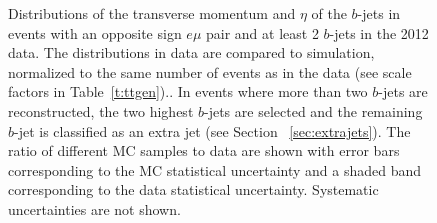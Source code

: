 \begin{figure}
\centering
{}

\caption{Distributions of the transverse momentum and $\eta$ of the $b$-jets in events with an opposite sign $e\mu$ pair  and at least 2 $b$-jets in the 2012 data. The distributions in data are compared to simulation, normalized to the same number of events as in the data  (see scale factors in Table~\ref{t:ttgen}).. In events where more than two $b$-jets are reconstructed, the two highest \pt $b$-jets are selected and the remaining $b$-jet is classified as an extra jet (see Section ~\ref{sec:extrajets}). The ratio of different MC samples to data are shown with error bars corresponding to the MC statistical uncertainty and a shaded band corresponding to the data statistical uncertainty. Systematic uncertainties are not shown.}
\label{fig:bjet}
\end{figure}

